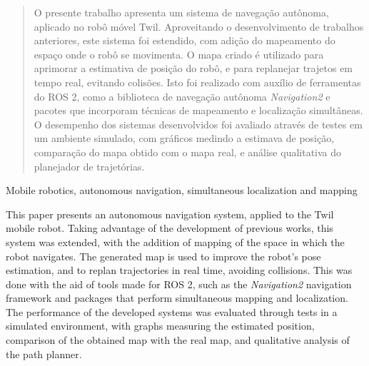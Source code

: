 \documentclass[repeatfields,xlists,xpacks,oneside,yearsonly]{ufrgscca}
\begin{document}
\maketitle




\begin{abstract}

    O presente trabalho apresenta um sistema de navegação autônoma,
    aplicado no robô móvel Twil. Aproveitando o desenvolvimento de
    trabalhos anteriores, este sistema foi estendido, com adição do
    mapeamento do espaço onde o robô se movimenta. O mapa criado é
    utilizado para aprimorar a estimativa de posição do robô, e para
    replanejar trajetos em tempo real, evitando colisões. Isto foi
    realizado com auxílio de ferramentas do ROS 2, como a biblioteca de
    navegação autônoma \textit{Navigation2} e pacotes que incorporam
    técnicas de mapeamento e localização simultâneas. O desempenho dos
    sistemas desenvolvidos foi avaliado através de testes em um ambiente
    simulado, com gráficos medindo a estimava de posição, comparação do
    mapa obtido com o mapa real, e análise qualitativa do planejador de
    trajetórias.

\end{abstract}

\begin{otherabstract}{Mobile robotics, autonomous navigation, simultaneous localization and mapping}

    This paper presents an autonomous navigation system, applied to the
    Twil mobile robot. Taking advantage of the development of previous
    works, this system was extended, with the addition of mapping of the
    space in which the robot navigates. The generated map is used to
    improve the robot's pose estimation, and to replan trajectories in
    real time, avoiding collisions. This was done with the aid of tools
    made for ROS 2, such as the \textit{Navigation2} navigation framework
    and packages that perform simultaneous mapping and localization. The
    performance of the developed systems was evaluated through tests in a
    simulated environment, with graphs measuring the estimated position,
    comparison of the obtained map with the real map, and qualitative
    analysis of the path planner.

\end{otherabstract}
\end{document}
